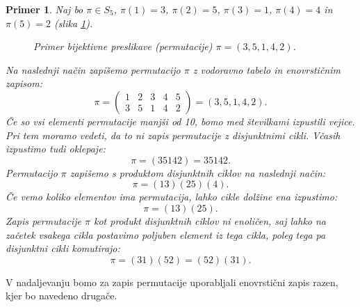 \documentclass[a4paper, 12pt]{book}
\newtheorem{primer}{Primer}[chapter]
\begin{document}
\begin{primer}
    Naj bo $\pi \in S_5$, $\pi(1) = 3$, $\pi(2) = 5$, $\pi(3) = 1$, $\pi(4) = 4$ in $\pi(5) = 2$ (slika \ref{bijektivna_preslikava_n_n}). 
    \begin{figure}[h]
        \begin{center}        
        \end{center}
        \caption{Primer bijektivne preslikave (permutacije) $\pi = (3, 5, 1, 4, 2)$.}
        \label{bijektivna_preslikava_n_n}
    \end{figure}
    Na naslednji način zapišemo permutacijo $\pi$ z vodoravno tabelo in enovrstičnim zapisom:
    \[
        \pi = \begin{pmatrix}
            1 & 2 & 3 & 4 & 5 \\
            3 & 5 & 1 & 4 & 2
        \end{pmatrix} = (3, 5, 1, 4, 2).
    \]
    Če so vsi elementi permutacije manjši od 10, bomo med številkami izpustili vejice. Pri tem moramo vedeti, da to ni zapis permutacije z disjunktnimi cikli. Včasih izpustimo tudi oklepaje:
    \[
        \pi = (3 5 1 4 2) = 35142.
    \]
    Permutacijo $\pi$ zapišemo s produktom disjunktnih ciklov na naslednji način:
    \[
        \pi = (1 3)(2 5)(4).
    \]
    Če vemo koliko elementov ima permutacija, lahko cikle dolžine ena izpustimo: 
    \[
        \pi = (1 3)(2 5).
    \]
    Zapis permutacije $\pi$ kot produkt disjunktnih ciklov ni enoličen, saj lahko na začetek vsakega cikla postavimo poljuben element iz tega cikla, poleg tega pa disjunktni cikli komutirajo:
    \[
        \pi = (3 1)(5 2) = (5 2)(3 1).
    \]
\end{primer}

V nadaljevanju bomo za zapis permutacije uporabljali enovrstični zapis razen, kjer bo navedeno drugače.
\end{document}
